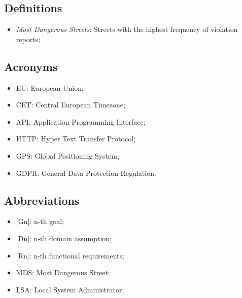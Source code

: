 \subsection{Definitions}
\begin{itemize}
  \item \textit{Most Dangerous Streets}: Streets with the highest frequency of violation reports;
\end{itemize}

\subsection{Acronyms}
\begin{itemize}
  \item EU: European Union;
  \item CET: Central European Timezone;
  \item API: Application Programming Interface;
  \item HTTP: Hyper Text Transfer Protocol;
  \item GPS: Global Positioning System;
  \item GDPR: General Data Protection Regulation.
\end{itemize}

\subsection{Abbreviations}
\begin{itemize}
  \item {[Gn]}: n-th goal;
  \item {[Dn]}: n-th domain assumption;
  \item {[Rn]}: n-th functional requirements;
  \item MDS: Most Dangerous Street;
  \item LSA: Local System Administrator;
\end{itemize}
